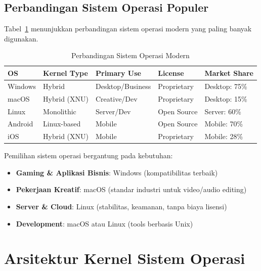 \subsection{Perbandingan Sistem Operasi Populer}

Tabel~\ref{tab:os-comparison} menunjukkan perbandingan sistem operasi modern yang paling banyak digunakan.

\begin{table}[htbp]
    \centering
    \caption{Perbandingan Sistem Operasi Modern}
    \label{tab:os-comparison}
    \begin{tabular}{@{}lllll@{}}
        \toprule
        \textbf{OS} & \textbf{Kernel Type} & \textbf{Primary Use} & \textbf{License} & \textbf{Market Share} \\
        \midrule
        Windows & Hybrid & Desktop/Business & Proprietary & Desktop: 75\% \\
        macOS & Hybrid (XNU) & Creative/Dev & Proprietary & Desktop: 15\% \\
        Linux & Monolithic & Server/Dev & Open Source & Server: 60\% \\
        Android & Linux-based & Mobile & Open Source & Mobile: 70\% \\
        iOS & Hybrid (XNU) & Mobile & Proprietary & Mobile: 28\% \\
        \bottomrule
    \end{tabular}
\end{table}

\begin{tipbox}
Pemilihan sistem operasi bergantung pada kebutuhan:
\begin{itemize}
    \item \textbf{Gaming \& Aplikasi Bisnis}: Windows (kompatibilitas terbaik)
    \item \textbf{Pekerjaan Kreatif}: macOS (standar industri untuk video/audio editing)
    \item \textbf{Server \& Cloud}: Linux (stabilitas, keamanan, tanpa biaya lisensi)
    \item \textbf{Development}: macOS atau Linux (tools berbasis Unix)
\end{itemize}
\end{tipbox}

\section{Arsitektur Kernel Sistem Operasi}
\label{sec:kernel-architecture}

